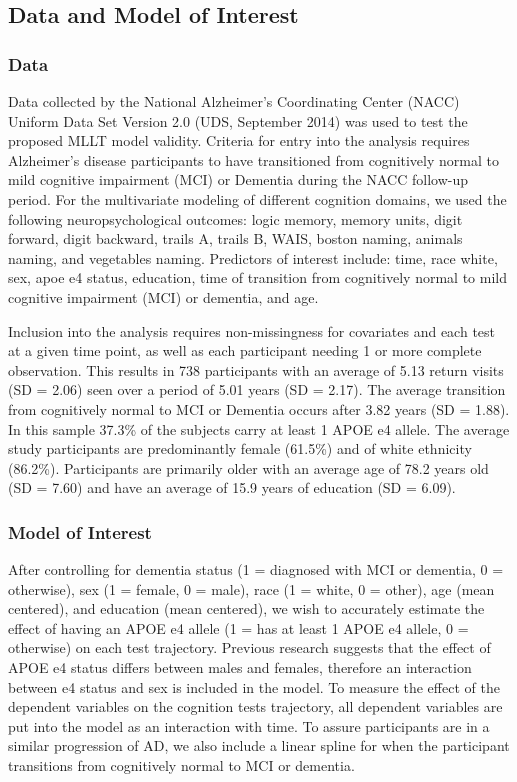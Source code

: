 \documentclass[
]{article}
\author{}
\date{\vspace{-2.5em}}
\begin{document}
\hypertarget{data-and-model-of-interest}{%
\subsection{Data and Model of Interest}\label{data-and-model-of-interest}}

\hypertarget{data}{%
\subsubsection{Data}\label{data}}

Data collected by the National Alzheimer's Coordinating Center (NACC) Uniform Data Set Version 2.0 (UDS, September 2014) was used to test the proposed MLLT model validity. Criteria for entry into the analysis requires Alzheimer's disease participants to have transitioned from cognitively normal to mild cognitive impairment (MCI) or Dementia during the NACC follow-up period. For the multivariate modeling of different cognition domains, we used the following neuropsychological outcomes: logic memory, memory units, digit forward, digit backward, trails A, trails B, WAIS, boston naming, animals naming, and vegetables naming. Predictors of interest include: time, race white, sex, apoe e4 status, education, time of transition from cognitively normal to mild cognitive impairment (MCI) or dementia, and age.

Inclusion into the analysis requires non-missingness for covariates and each test at a given time point, as well as each participant needing 1 or more complete observation. This results in 738 participants with an average of 5.13 return visits (SD = 2.06) seen over a period of 5.01 years (SD = 2.17). The average transition from cognitively normal to MCI or Dementia occurs after 3.82 years (SD = 1.88). In this sample 37.3\% of the subjects carry at least 1 APOE e4 allele. The average study participants are predominantly female (61.5\%) and of white ethnicity (86.2\%). Participants are primarily older with an average age of 78.2 years old (SD = 7.60) and have an average of 15.9 years of education (SD = 6.09).

\hypertarget{model-of-interest}{%
\subsubsection{Model of Interest}\label{model-of-interest}}

After controlling for dementia status (1 = diagnosed with MCI or dementia, 0 = otherwise), sex (1 = female, 0 = male), race (1 = white, 0 = other), age (mean centered), and education (mean centered), we wish to accurately estimate the effect of having an APOE e4 allele (1 = has at least 1 APOE e4 allele, 0 = otherwise) on each test trajectory. Previous research suggests that the effect of APOE e4 status differs between males and females, therefore an interaction between e4 status and sex is included in the model. To measure the effect of the dependent variables on the cognition tests trajectory, all dependent variables are put into the model as an interaction with time. To assure participants are in a similar progression of AD, we also include a linear spline for when the participant transitions from cognitively normal to MCI or dementia.
\end{document}
